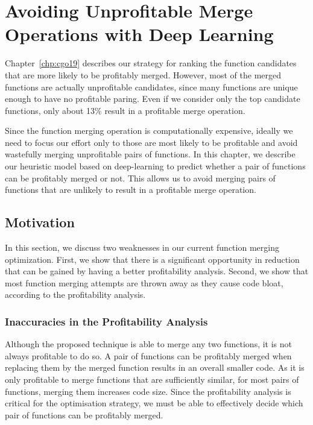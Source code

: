 
\chapter{Avoiding Unprofitable Merge Operations with Deep Learning} \label{chp:deeplearning}

Chapter~\ref{chp:cgo19} describes our strategy for ranking the function candidates that are more likely to be profitably merged.
However, most of the merged functions are actually unprofitable candidates, since many functions are unique enough to have no profitable paring.
Even if we consider only the top candidate functions, only about 13\% result in a profitable merge operation.

Since the function merging operation is computationally expensive, ideally we need to focus our effort only to those are most likely to be profitable and avoid wastefully merging unprofitable pairs of functions.
In this chapter, we describe our heuristic model based on deep-learning to predict whether a pair of functions can be
profitably merged or not.
This allows us to avoid merging pairs of functions that are unlikely to result in a profitable merge operation.

\section{Motivation} \label{sec:deeplearning:motivation}

In this section, we discuss two weaknesses in our current function merging optimization.
First, we show that there is a significant opportunity in reduction that can be gained by having a better profitability analysis.
Second, we show that most function merging attempts are thrown away as they cause code bloat, according to the profitability analysis.

\subsection{Inaccuracies in the Profitability Analysis}

Although the proposed technique is able to merge any two functions, it is not always profitable to do so.
A pair of functions can be profitably merged when replacing them by the merged function results in an overall smaller code.
As it is only profitable to merge functions that are sufficiently similar, for most pairs of functions, merging them increases code size.
Since the profitability analysis is critical for the optimisation strategy, we must be able to effectively decide which pair of functions can be profitably merged.

